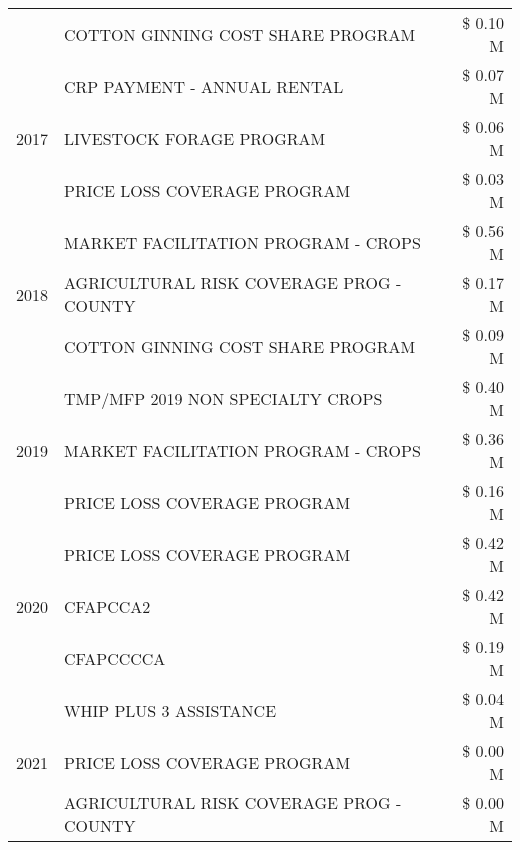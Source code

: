 \begin{tabular}{llr}
 & COTTON GINNING COST SHARE PROGRAM & \$ 0.10 M \\
\cline{1-3}
\multirow[t]{3}{*}{2017} & CRP PAYMENT - ANNUAL RENTAL & \$ 0.07 M \\
 & LIVESTOCK FORAGE PROGRAM & \$ 0.06 M \\
 & PRICE LOSS COVERAGE PROGRAM & \$ 0.03 M \\
\cline{1-3}
\multirow[t]{3}{*}{2018} & MARKET FACILITATION PROGRAM - CROPS & \$ 0.56 M \\
 & AGRICULTURAL RISK COVERAGE PROG - COUNTY & \$ 0.17 M \\
 & COTTON GINNING COST SHARE PROGRAM & \$ 0.09 M \\
\cline{1-3}
\multirow[t]{3}{*}{2019} & TMP/MFP 2019 NON SPECIALTY CROPS & \$ 0.40 M \\
 & MARKET FACILITATION PROGRAM - CROPS & \$ 0.36 M \\
 & PRICE LOSS COVERAGE PROGRAM & \$ 0.16 M \\
\cline{1-3}
\multirow[t]{3}{*}{2020} & PRICE LOSS COVERAGE PROGRAM & \$ 0.42 M \\
 & CFAPCCA2 & \$ 0.42 M \\
 & CFAPCCCCA & \$ 0.19 M \\
\cline{1-3}
\multirow[t]{3}{*}{2021} & WHIP PLUS 3 ASSISTANCE & \$ 0.04 M \\
 & PRICE LOSS COVERAGE PROGRAM & \$ 0.00 M \\
 & AGRICULTURAL RISK COVERAGE PROG - COUNTY & \$ 0.00 M \\
\cline{1-3}
\bottomrule
\end{tabular}
